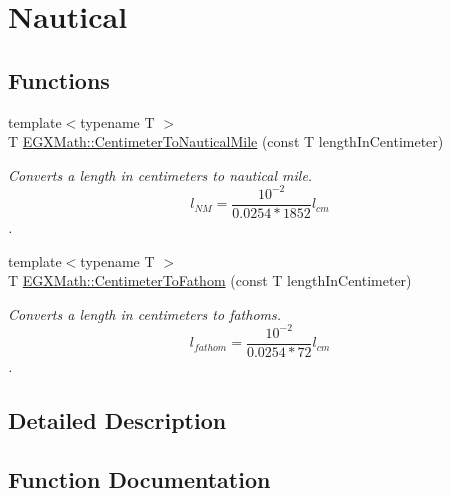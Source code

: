 \hypertarget{group___e_g_x_math-_conversions-_length_conversions-_s_i-_centimeter-_nautical}{}\section{Nautical}
\label{group___e_g_x_math-_conversions-_length_conversions-_s_i-_centimeter-_nautical}
\subsection*{Functions}
\begin{DoxyCompactItemize}
\item 
{\footnotesize template$<$typename T $>$ }\\T \mbox{\hyperlink{group___e_g_x_math-_conversions-_length_conversions-_s_i-_centimeter-_nautical_ga65cf4453e28b375ee5c52389620939c6}{E\+G\+X\+Math\+::\+Centimeter\+To\+Nautical\+Mile}} (const T length\+In\+Centimeter)
\begin{DoxyCompactList}\small\item\em Converts a length in centimeters to nautical mile. \[ l_{NM}= \frac{10^{-2}}{0.0254 * 1852} l_{cm} \]. \end{DoxyCompactList}\item 
{\footnotesize template$<$typename T $>$ }\\T \mbox{\hyperlink{group___e_g_x_math-_conversions-_length_conversions-_s_i-_centimeter-_nautical_ga9a46ae39f9cc70947d27a297c1c3f113}{E\+G\+X\+Math\+::\+Centimeter\+To\+Fathom}} (const T length\+In\+Centimeter)
\begin{DoxyCompactList}\small\item\em Converts a length in centimeters to fathoms. \[ l_{fathom}= \frac{10^{-2}}{0.0254 * 72} l_{cm} \]. \end{DoxyCompactList}\end{DoxyCompactItemize}


\subsection{Detailed Description}


\subsection{Function Documentation}
\mbox{\label{group___e_g_x_math-_conversions-_length_conversions-_s_i-_centimeter-_nautical_ga9a46ae39f9cc70947d27a297c1c3f113}} 

